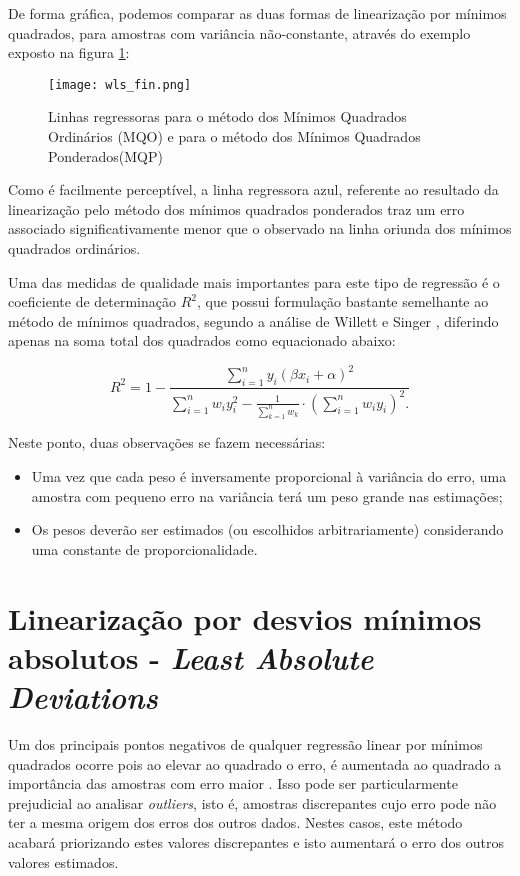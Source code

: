 De forma gráfica, podemos comparar as duas formas de linearização por mínimos quadrados, para amostras com variância não-constante, através do exemplo exposto na figura \ref{fig:mqomqp}:

\begin{figure}[htp]
    \centering
    \texttt{[image: wls\_fin.png]}
    \caption{Linhas regressoras para o método dos Mínimos Quadrados Ordinários (MQO) e para o método dos Mínimos Quadrados Ponderados(MQP)}
    \label{fig:mqomqp}
\end{figure}

Como é facilmente perceptível, a linha regressora azul, referente ao resultado da linearização pelo método dos mínimos quadrados ponderados traz um erro associado significativamente menor que o observado na linha oriunda dos mínimos quadrados ordinários.

Uma das medidas de qualidade mais importantes para este tipo de regressão é o coeficiente de determinação $R^2$, que possui formulação bastante semelhante ao método de mínimos quadrados, segundo a análise de Willett e Singer \cite{r2_weighted}, diferindo apenas na soma total dos quadrados como equacionado abaixo:

\begin{equation}\label{eq:16}
R^2 = 1 - \frac{\sum_{i=1}^{n} y_i(\beta x_i + \alpha)^2}{\sum\limits_{i=1}^{n}{w_{i}y_{i}^{2}} - \frac{1}{\sum\limits_{k=1}^{n}w_{k}} \cdot \left(\sum\limits_{i=1}^{n}{w_{i}y_{i}} \right)^{2}.}
\end{equation}

Neste ponto, duas observações se fazem necessárias:

\begin{itemize}
  \item Uma vez que cada peso é inversamente proporcional à variância do erro, uma amostra com pequeno erro na variância terá um peso grande nas estimações;
  \item Os pesos deverão ser estimados (ou escolhidos arbitrariamente) considerando uma constante de proporcionalidade.
\end{itemize}

\section{Linearização por desvios mínimos absolutos - \textit{Least Absolute Deviations}}

Um dos principais pontos negativos de qualquer regressão linear por mínimos quadrados ocorre pois ao elevar ao quadrado o erro, é aumentada ao quadrado a importância das amostras com erro maior \cite{robust}. Isso pode ser particularmente prejudicial ao analisar \textit{outliers}, isto é, amostras discrepantes cujo erro pode não ter a mesma origem dos erros dos outros dados. Nestes casos, este método acabará priorizando estes valores discrepantes e isto aumentará o erro dos outros valores estimados.

